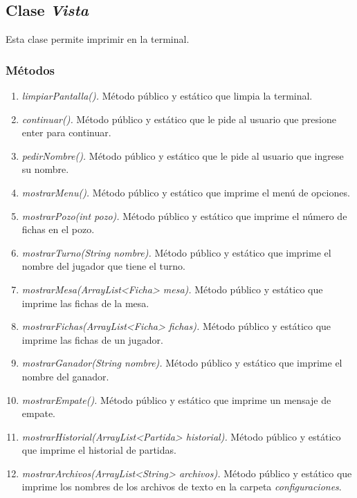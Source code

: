 \documentclass[12pt]{article}
\begin{document}
  \subsection{Clase \textit{Vista}}
  Esta clase permite imprimir en la terminal.

  \subsubsection{Métodos}
  \begin{enumerate}
    \item \textit{limpiarPantalla().} Método público y estático que limpia la terminal.
    \item \textit{continuar().} Método público y estático que le pide al usuario que presione enter para continuar.
    \item \textit{pedirNombre().} Método público y estático que le pide al usuario que ingrese su nombre.
    \item \textit{mostrarMenu().} Método público y estático que imprime el menú de opciones.
    \item \textit{mostrarPozo(int pozo).} Método público y estático que imprime el número de fichas en el pozo.
    \item \textit{mostrarTurno(String nombre).} Método público y estático que imprime el nombre del jugador que tiene el turno. 
    \item \textit{mostrarMesa(ArrayList<Ficha> mesa).} Método público y estático que imprime las fichas de la mesa.
    \item \textit{mostrarFichas(ArrayList<Ficha> fichas).} Método público y estático que imprime las fichas de un jugador.
    \item \textit{mostrarGanador(String nombre).} Método público y estático que imprime el nombre del ganador.
    \item \textit{mostrarEmpate().} Método público y estático que imprime un mensaje de empate.
    \item \textit{mostrarHistorial(ArrayList<Partida> historial).} Método público y estático que imprime el historial de partidas.
    \item \textit{mostrarArchivos(ArrayList<String> archivos).} Método público y estático que imprime los nombres de los archivos de texto en la carpeta \textit{configuraciones}. 
  \end{enumerate}
\end{document}
